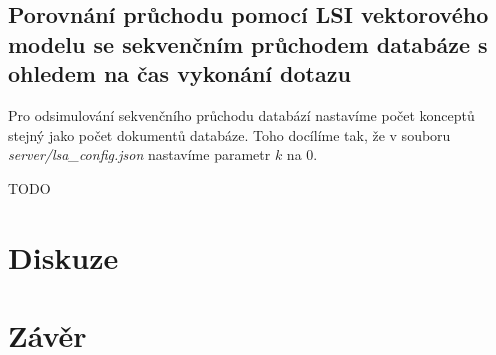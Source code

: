 \documentclass[11pt]{scrartcl} %
\begin{document}
\subsection{Porovnání průchodu pomocí LSI vektorového modelu se sekvenčním průchodem databáze s ohledem na čas vykonání dotazu}

Pro odsimulování sekvenčního průchodu databází nastavíme počet konceptů stejný jako počet dokumentů databáze. Toho docílíme tak, že v souboru \emph{server/lsa\_config.json} nastavíme parametr $k$ na 0.

TODO

\section{Diskuze}


\section{Závěr}
\end{document}
